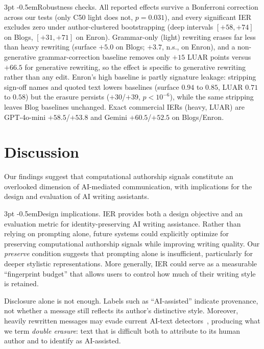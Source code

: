 \documentclass[sigconf,nonacm]{acmart}
\makeatletter
\renewcommand\paragraph{\@startsection{paragraph}{4}{\z@}%
  {3pt \@plus 1pt \@minus 1pt}{-0.5em}{\normalfont\normalsize\bfseries}}
\makeatother
\begin{document}
\paragraph{Robustness checks.}
All reported effects survive a Bonferroni correction across our tests (only C50
light does not, $p=0.031$), and every significant IER excludes zero under
author-clustered bootstrapping (deep intervals $[+58,+74]$ on Blogs, $[+31,+71]$ on
Enron). Grammar-only (light) rewriting erases far less than heavy rewriting (surface
$+5.0$ on Blogs; $+3.7$, n.s., on Enron), and a non-generative grammar-correction
baseline removes only $+15$ LUAR points versus $+66.5$ for generative rewriting, so
the effect is specific to generative rewriting rather than any edit. Enron's high
baseline is partly signature leakage: stripping sign-off names and quoted text
lowers baselines (surface $0.94$ to $0.85$, LUAR $0.71$ to $0.58$) but the erasure
persists ($+30$/$+39$, $p<10^{-6}$), while the same stripping leaves Blog baselines
unchanged. Exact commercial IERs (heavy, LUAR) are GPT-4o-mini $+58.5$/$+53.8$ and
Gemini $+60.5$/$+52.5$ on Blogs/Enron.

\section{Discussion}

Our findings suggest that computational authorship signals constitute an overlooked
dimension of AI-mediated communication, with implications for the design and
evaluation of AI writing assistants.

\paragraph{Design implications.}
IER provides both a design objective and an evaluation metric for
identity-preserving AI writing assistance. Rather than relying on prompting alone,
future systems could explicitly optimize for preserving computational authorship
signals while improving writing quality. Our \emph{preserve} condition suggests that
prompting alone is insufficient, particularly for deeper stylistic representations.
More generally, IER could serve as a measurable ``fingerprint budget'' that allows
users to control how much of their writing style is retained.

Disclosure alone is not enough. Labels such as ``AI-assisted'' indicate provenance,
not whether a message still reflects its author's distinctive style. Moreover,
heavily rewritten messages may evade current AI-text
detectors~\cite{sadasivan2023,krishna2023}, producing what we term \emph{double
erasure}: text that is difficult both to attribute to its human author and to
identify as AI-assisted.
\end{document}
